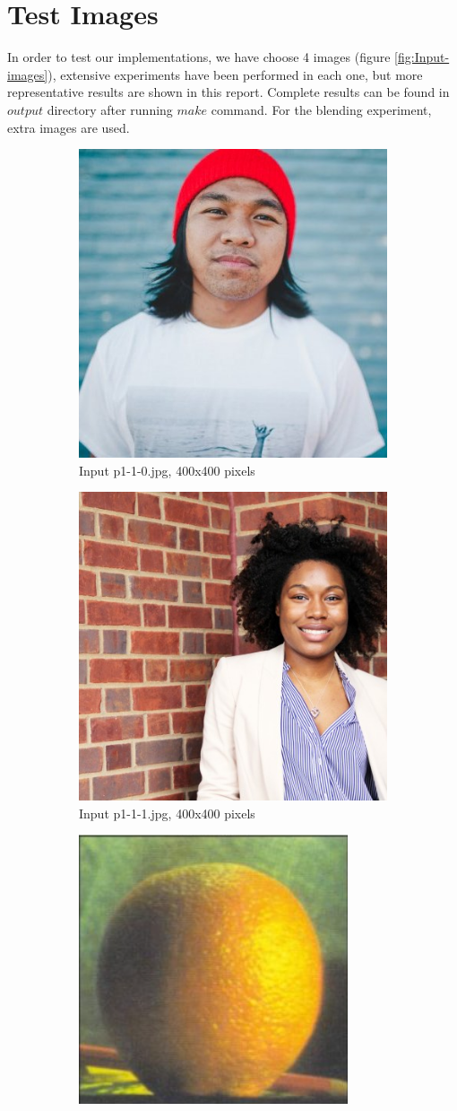 \section{Test Images}

In order to test our implementations, we have choose 4 images (figure \ref{fig:Input-images}), extensive experiments have been performed in each one, but more representative results are shown in this report. Complete results can be found in $output$ directory after running $make$ command. For the blending experiment, extra images are used.

\begin{figure}[h!]
\centering
\begin{subfigure}{0.5\textwidth}
  \centering
  \includegraphics[width=0.5\linewidth]{input/p1-1-0.jpg}
  \caption{Input p1-1-0.jpg, 400x400 pixels}
\end{subfigure}%
\begin{subfigure}{0.5\textwidth}
  \centering
  \includegraphics[width=0.5\linewidth]{input/p1-1-1.jpg}
  \caption{Input p1-1-1.jpg, 400x400 pixels}
\end{subfigure}
\begin{subfigure}{0.5\textwidth}
  \centering
  \includegraphics[width=0.5\linewidth]{input/p1-1-2.png}

\end{subfigure}
\end{figure}
